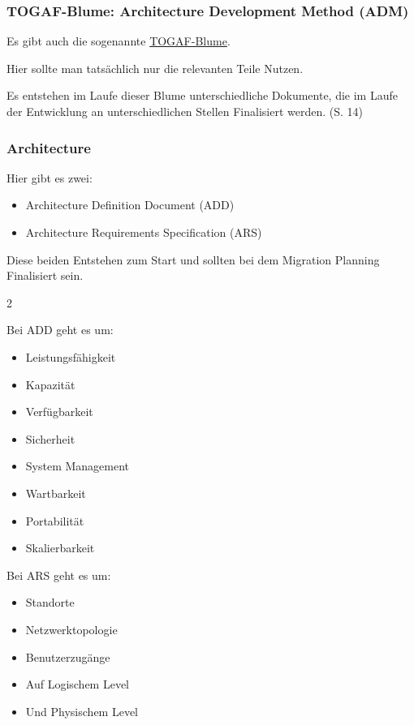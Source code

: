 \documentclass[a4paper]{article}
\begin{document}
\subsubsection{TOGAF-Blume: Architecture Development Method (ADM)}

Es gibt auch die sogenannte \href{https://de.wikipedia.org/wiki/TOGAF#/media/Datei:TOGAF_ADM.svg}{TOGAF-Blume}.

Hier sollte man tatsächlich nur die relevanten Teile Nutzen.

Es entstehen im Laufe dieser Blume unterschiedliche Dokumente, die im Laufe der Entwicklung an unterschiedlichen Stellen Finalisiert werden. (S. 14)

\subsubsection{Architecture}

Hier gibt es zwei:

\begin{itemize}
    \item Architecture Definition Document (ADD)
    \item Architecture Requirements Specification (ARS)
\end{itemize}

Diese beiden Entstehen zum Start und sollten bei dem Migration Planning Finalisiert sein.

\begin{multicols*}{2}
\raggedcolumns

Bei ADD geht es um:

\begin{itemize}
    \item Leistungsfähigkeit
    \item Kapazität
    \item Verfügbarkeit 
    \item Sicherheit
    \item System Management
    \item Wartbarkeit
    \item Portabilität
    \item Skalierbarkeit
\end{itemize}
\columnbreak

Bei ARS geht es um:

\begin{itemize}
    \item Standorte
    \item Netzwerktopologie
    \item Benutzerzugänge
    \item Auf Logischem Level
    \item Und Physischem Level
\end{itemize}

\end{multicols*}
\end{document}
